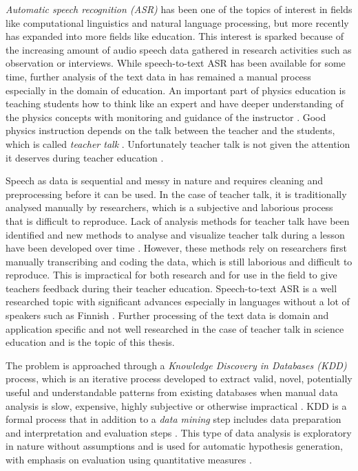 \documentclass[utf8,english]{gradu3}
\begin{document}
\emph{Automatic speech recognition (ASR)} has been one of the topics of interest in fields like computational linguistics and natural language processing, but more recently has expanded into more fields like education. This interest is sparked because of the increasing amount of audio speech data gathered in research activities such as observation or interviews. While speech-to-text ASR has been available for some time, further analysis of the text data in has remained a manual process especially in the domain of education. An important part of physics education is teaching students how to think like an expert and have deeper understanding of the physics concepts with monitoring and guidance of the instructor \parencite{wiemanTransformingPhysicsEducation2007}. Good physics instruction depends on the talk between the teacher and the students, which is called \emph{teacher talk} \parencite{scottTeachingScienceMeaningful2007}. Unfortunately teacher talk is not given the attention it deserves during teacher education \parencite{crespoPraisingCorrectingProspective2002,lehesvuoriDialogicTeachingScience2013}. 

Speech as data is sequential and messy in nature and requires cleaning and preprocessing before it can be used. In the case of teacher talk, it is traditionally analysed manually by researchers, which is a subjective and laborious process that is difficult to reproduce. Lack of analysis methods for teacher talk have been identified and new methods to analyse and visualize teacher talk during a lesson have been developed over time \parencite{viiriTeacherTalkPatterns2006,lehesvuoriVisualizingCommunicationStructures2013}. However, these methods rely on researchers first manually transcribing and coding the data, which is still laborious and difficult to reproduce. This is impractical for both research and for use in the field to give teachers feedback during their teacher education. Speech-to-text ASR is a well researched topic with significant advances especially in languages without a lot of speakers such as Finnish \parencite{kurimoModelingUnderresourcedLanguages2017}. Further processing of the text data is domain and application specific and not well researched in the case of teacher talk in science education and is the topic of this thesis. 

The problem is approached through a \emph{Knowledge Discovery in Databases (KDD)} process, which is an iterative process developed to extract valid, novel, potentially useful and understandable patterns from existing databases when manual data analysis is slow, expensive, highly subjective or otherwise impractical \parencite{fayyadKDDProcessExtracting1996}. KDD is a formal process that in addition to a \emph{data mining} step includes data preparation and interpretation and evaluation steps \parencite{fayyadKDDProcessExtracting1996}. This type of data analysis is exploratory in nature without assumptions and is used for automatic hypothesis generation, with emphasis on evaluation using quantitative measures \parencite{fayyadKDDProcessExtracting1996}.
\end{document}
